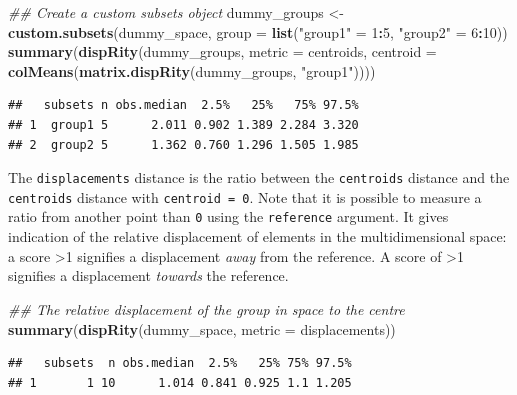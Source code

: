 \documentclass[]{book}
\newenvironment{Shaded}{\begin{snugshade}}{\end{snugshade}}
\newcommand{\CommentTok}[1]{\textcolor[rgb]{0.56,0.35,0.01}{\textit{#1}}}
\newcommand{\DataTypeTok}[1]{\textcolor[rgb]{0.13,0.29,0.53}{#1}}
\newcommand{\DecValTok}[1]{\textcolor[rgb]{0.00,0.00,0.81}{#1}}
\newcommand{\KeywordTok}[1]{\textcolor[rgb]{0.13,0.29,0.53}{\textbf{#1}}}
\newcommand{\NormalTok}[1]{#1}
\newcommand{\OperatorTok}[1]{\textcolor[rgb]{0.81,0.36,0.00}{\textbf{#1}}}
\newcommand{\StringTok}[1]{\textcolor[rgb]{0.31,0.60,0.02}{#1}}
\begin{document}
\begin{Shaded}
\begin{Highlighting}[]
\CommentTok{## Create a custom subsets object}
\NormalTok{dummy_groups <-}\StringTok{ }\KeywordTok{custom.subsets}\NormalTok{(dummy_space,}
                               \DataTypeTok{group =} \KeywordTok{list}\NormalTok{(}\StringTok{"group1"}\NormalTok{ =}\StringTok{ }\DecValTok{1}\OperatorTok{:}\DecValTok{5}\NormalTok{,}
                                            \StringTok{"group2"}\NormalTok{ =}\StringTok{ }\DecValTok{6}\OperatorTok{:}\DecValTok{10}\NormalTok{))}
\KeywordTok{summary}\NormalTok{(}\KeywordTok{dispRity}\NormalTok{(dummy_groups, }\DataTypeTok{metric =}\NormalTok{ centroids,}
    \DataTypeTok{centroid =} \KeywordTok{colMeans}\NormalTok{(}\KeywordTok{matrix.dispRity}\NormalTok{(dummy_groups, }\StringTok{"group1"}\NormalTok{))))}
\end{Highlighting}
\end{Shaded}

\begin{verbatim}
##   subsets n obs.median  2.5%   25%   75% 97.5%
## 1  group1 5      2.011 0.902 1.389 2.284 3.320
## 2  group2 5      1.362 0.760 1.296 1.505 1.985
\end{verbatim}

The \texttt{displacements} distance is the ratio between the \texttt{centroids} distance and the \texttt{centroids} distance with \texttt{centroid\ =\ 0}.
Note that it is possible to measure a ratio from another point than \texttt{0} using the \texttt{reference} argument.
It gives indication of the relative displacement of elements in the multidimensional space: a score \textgreater{}1 signifies a displacement \emph{away} from the reference. A score of \textgreater{}1 signifies a displacement \emph{towards} the reference.

\begin{Shaded}
\begin{Highlighting}[]
\CommentTok{## The relative displacement of the group in space to the centre}
\KeywordTok{summary}\NormalTok{(}\KeywordTok{dispRity}\NormalTok{(dummy_space, }\DataTypeTok{metric =}\NormalTok{ displacements))}
\end{Highlighting}
\end{Shaded}

\begin{verbatim}
##   subsets  n obs.median  2.5%   25% 75% 97.5%
## 1       1 10      1.014 0.841 0.925 1.1 1.205
\end{verbatim}
\end{document}
